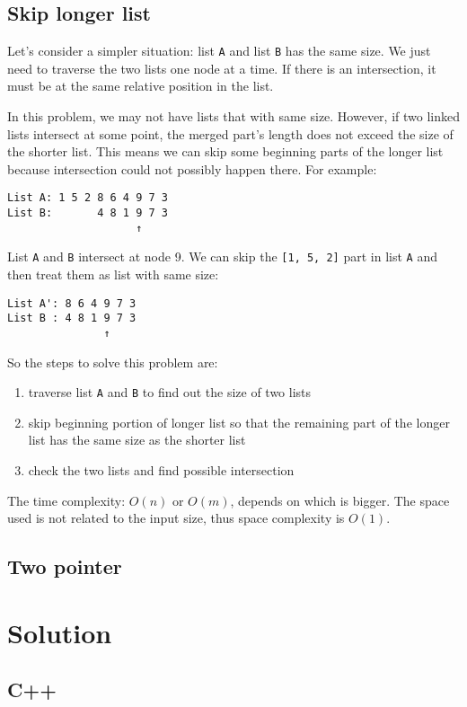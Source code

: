 \documentclass[12pt]{book}
\begin{document}
\subsection{Skip longer list}
\label{sec:org618d29b}
Let's consider a simpler situation: list \texttt{A} and list \texttt{B} has the same size. We just need to traverse the two lists one node at a time. If there is an intersection, it must be at the same relative position in the list.

In this problem, we may not have lists that with same size. However, if two linked lists intersect at some point, the merged part's length does not exceed the size of the shorter list. This means we can skip some beginning parts of the longer list because intersection could not possibly happen there. For example:
\begin{verbatim}
List A: 1 5 2 8 6 4 9 7 3
List B:       4 8 1 9 7 3
                    ↑
\end{verbatim}
List \texttt{A} and \texttt{B} intersect at node 9. We can skip the \texttt{[1, 5, 2]} part in list \texttt{A} and then treat them as list with same size:
\begin{verbatim}
List A': 8 6 4 9 7 3
List B : 4 8 1 9 7 3
               ↑
\end{verbatim}

So the steps to solve this problem are:
\begin{enumerate}
\item traverse list \texttt{A} and \texttt{B} to find out the size of two lists
\item skip beginning portion of longer list so that the remaining part of the longer list has the same size as the shorter list
\item check the two lists and find possible intersection
\end{enumerate}

The time complexity: \(O(n)\) or \(O(m)\), depends on which is bigger. The space used is not related to the input size, thus space complexity is \(O(1)\).

\subsection{Two pointer}
\label{sec:orga158047}
\section{Solution}
\label{sec:org109467d}
\subsection{C++}
\label{sec:org1f5d741}
\end{document}
